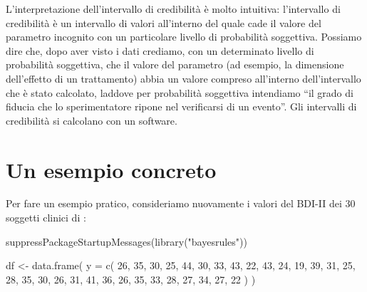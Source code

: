 \documentclass[
  11pt,
  italian,
  a4paper,
  extrafontsizes,onecolumn,openright
  ]{memoir}
\newenvironment{Shaded}{\begin{snugshade}}{\end{snugshade}}
\newcommand{\AttributeTok}[1]{\textcolor[rgb]{0.77,0.63,0.00}{#1}}
\newcommand{\DecValTok}[1]{\textcolor[rgb]{0.00,0.00,0.81}{#1}}
\newcommand{\FunctionTok}[1]{\textcolor[rgb]{0.00,0.00,0.00}{#1}}
\newcommand{\NormalTok}[1]{#1}
\newcommand{\OtherTok}[1]{\textcolor[rgb]{0.56,0.35,0.01}{#1}}
\newcommand{\StringTok}[1]{\textcolor[rgb]{0.31,0.60,0.02}{#1}}
\begin{document}
L'interpretazione dell'intervallo di credibilità è molto intuitiva:
l'intervallo di credibilità è un intervallo di valori all'interno del
quale cade il valore del parametro incognito con un particolare livello
di probabilità soggettiva. Possiamo dire che, dopo aver visto i dati
crediamo, con un determinato livello di probabilità soggettiva, che il
valore del parametro (ad esempio, la dimensione dell'effetto di un
trattamento) abbia un valore compreso all'interno dell'intervallo che è
stato calcolato, laddove per probabilità soggettiva intendiamo ``il grado di fiducia che lo sperimentatore ripone nel verificarsi di un evento''. Gli intervalli di credibilità si calcolano con un software.

\hypertarget{un-esempio-concreto}{%
\section{Un esempio concreto}\label{un-esempio-concreto}}

Per fare un esempio pratico, consideriamo nuovamente i valori del BDI-II dei 30 soggetti clinici di \textcite{zetschefuture2019}:

\begin{Shaded}
\begin{Highlighting}[]
\FunctionTok{suppressPackageStartupMessages}\NormalTok{(}\FunctionTok{library}\NormalTok{(}\StringTok{"bayesrules"}\NormalTok{))}

\NormalTok{df }\OtherTok{\textless{}{-}} \FunctionTok{data.frame}\NormalTok{(}
  \AttributeTok{y =} \FunctionTok{c}\NormalTok{(}
    \DecValTok{26}\NormalTok{, }\DecValTok{35}\NormalTok{, }\DecValTok{30}\NormalTok{, }\DecValTok{25}\NormalTok{, }\DecValTok{44}\NormalTok{, }\DecValTok{30}\NormalTok{, }\DecValTok{33}\NormalTok{, }\DecValTok{43}\NormalTok{, }\DecValTok{22}\NormalTok{, }\DecValTok{43}\NormalTok{,}
    \DecValTok{24}\NormalTok{, }\DecValTok{19}\NormalTok{, }\DecValTok{39}\NormalTok{, }\DecValTok{31}\NormalTok{, }\DecValTok{25}\NormalTok{, }\DecValTok{28}\NormalTok{, }\DecValTok{35}\NormalTok{, }\DecValTok{30}\NormalTok{, }\DecValTok{26}\NormalTok{, }\DecValTok{31}\NormalTok{,}
    \DecValTok{41}\NormalTok{, }\DecValTok{36}\NormalTok{, }\DecValTok{26}\NormalTok{, }\DecValTok{35}\NormalTok{, }\DecValTok{33}\NormalTok{, }\DecValTok{28}\NormalTok{, }\DecValTok{27}\NormalTok{, }\DecValTok{34}\NormalTok{, }\DecValTok{27}\NormalTok{, }\DecValTok{22}
\NormalTok{  )}
\NormalTok{)}
\end{Highlighting}
\end{Shaded}
\end{document}
